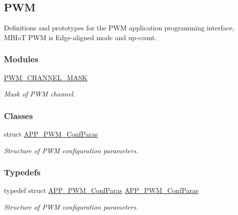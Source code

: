 \hypertarget{group___p_w_m}{}\subsection{P\+WM}
\label{group___p_w_m}


Definitions and prototypes for the P\+WM application programming interface, M\+B\+IoT P\+WM is Edge-\/aligned mode and up-\/count.  


\subsubsection*{Modules}
\begin{DoxyCompactItemize}
\item 
\hyperlink{group___p_w_m___c_h_a_n_n_e_l___m_a_s_k}{P\+W\+M\+\_\+\+C\+H\+A\+N\+N\+E\+L\+\_\+\+M\+A\+SK}
\begin{DoxyCompactList}\small\item\em Mask of P\+WM channel. \end{DoxyCompactList}\end{DoxyCompactItemize}
\subsubsection*{Classes}
\begin{DoxyCompactItemize}
\item 
struct \hyperlink{struct_a_p_p___p_w_m___conf_paras}{A\+P\+P\+\_\+\+P\+W\+M\+\_\+\+Conf\+Paras}
\begin{DoxyCompactList}\small\item\em Structure of P\+WM configuration parameters. \end{DoxyCompactList}\end{DoxyCompactItemize}
\subsubsection*{Typedefs}
\begin{DoxyCompactItemize}
\item 
typedef struct \hyperlink{struct_a_p_p___p_w_m___conf_paras}{A\+P\+P\+\_\+\+P\+W\+M\+\_\+\+Conf\+Paras} \hyperlink{group___p_w_m_ga0f430d07e4d7d25ddb6652517aab3ea7}{A\+P\+P\+\_\+\+P\+W\+M\+\_\+\+Conf\+Paras}\hypertarget{group___p_w_m_ga0f430d07e4d7d25ddb6652517aab3ea7}{}\label{group___p_w_m_ga0f430d07e4d7d25ddb6652517aab3ea7}

\begin{DoxyCompactList}\small\item\em Structure of P\+WM configuration parameters. \end{DoxyCompactList}\end{DoxyCompactItemize}
